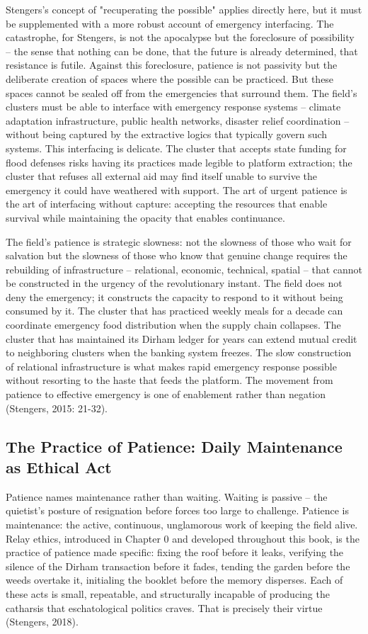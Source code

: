 Stengers's concept of "recuperating the possible" applies directly here, but it must be supplemented with a more robust account of emergency interfacing. The catastrophe, for Stengers, is not the apocalypse but the foreclosure of possibility -- the sense that nothing can be done, that the future is already determined, that resistance is futile. Against this foreclosure, patience is not passivity but the deliberate creation of spaces where the possible can be practiced. But these spaces cannot be sealed off from the emergencies that surround them. The field's clusters must be able to interface with emergency response systems -- climate adaptation infrastructure, public health networks, disaster relief coordination -- without being captured by the extractive logics that typically govern such systems. This interfacing is delicate. The cluster that accepts state funding for flood defenses risks having its practices made legible to platform extraction; the cluster that refuses all external aid may find itself unable to survive the emergency it could have weathered with support. The art of urgent patience is the art of interfacing without capture: accepting the resources that enable survival while maintaining the opacity that enables continuance.

The field's patience is strategic slowness: not the slowness of those who wait for salvation but the slowness of those who know that genuine change requires the rebuilding of infrastructure -- relational, economic, technical, spatial -- that cannot be constructed in the urgency of the revolutionary instant. The field does not deny the emergency; it constructs the capacity to respond to it without being consumed by it. The cluster that has practiced weekly meals for a decade can coordinate emergency food distribution when the supply chain collapses. The cluster that has maintained its Dirham ledger for years can extend mutual credit to neighboring clusters when the banking system freezes. The slow construction of relational infrastructure is what makes rapid emergency response possible without resorting to the haste that feeds the platform. The movement from patience to effective emergency is one of enablement rather than negation (Stengers, 2015: 21-32).

\subsection{The Practice of Patience: Daily Maintenance as Ethical Act}

Patience names maintenance rather than waiting. Waiting is passive -- the quietist's posture of resignation before forces too large to challenge. Patience is maintenance: the active, continuous, unglamorous work of keeping the field alive. Relay ethics, introduced in Chapter 0 and developed throughout this book, is the practice of patience made specific: fixing the roof before it leaks, verifying the silence of the Dirham transaction before it fades, tending the garden before the weeds overtake it, initialing the booklet before the memory disperses. Each of these acts is small, repeatable, and structurally incapable of producing the catharsis that eschatological politics craves. That is precisely their virtue (Stengers, 2018).


